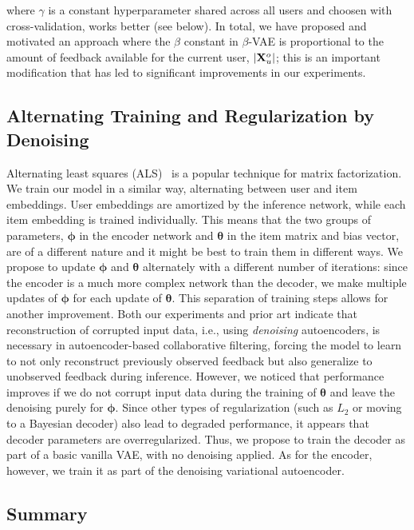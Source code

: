 \documentclass[sigconf,authorversion]{acmart}
\def\XX{{\bf X}}
\def\btheta{{\boldsymbol{\theta}}}
\def\bphi{{\boldsymbol{\phi}}}
\begin{document}
\noindent
where $\gamma$ is a constant hyperparameter shared across all users and choosen with cross-validation, works better (see below). 
In total, we have proposed and motivated an approach where the $\beta$ constant in $\beta$-VAE is proportional to the amount of feedback available for the current user, $|\XX_u^o|$; this is an important modification that has led to significant improvements in our experiments.

\subsection{Alternating Training and Regularization by Denoising}\label{sec:als}

Alternating least squares (ALS)~\cite{bell2007scalable} is a popular technique for matrix factorization. We train our model in a similar way, alternating between user and item embeddings. User embeddings are amortized by the inference network, while each item embedding is trained individually. This means that the two groups of parameters, $\bphi$ in the encoder network and $\btheta$ in the item matrix and bias vector, are of a different nature and it might be best to train them in different ways. We propose to update $\bphi$ and $\btheta$ alternately with a different number of iterations: since the encoder is a much more complex network than the decoder, we make multiple updates of $\bphi$ for each update of $\btheta$.
This separation of training steps allows for another improvement. Both our experiments and prior art indicate that reconstruction of corrupted input data, i.e., using \emph{denoising} autoencoders, is necessary in autoencoder-based collaborative filtering, forcing the model to learn to not only reconstruct previously observed feedback but also generalize to unobserved feedback during inference. However, we noticed that performance improves if we do not corrupt input data during the training of $\btheta$ and leave the denoising purely for $\bphi$.
Since other types of regularization (such as $L_2$ or moving to a Bayesian decoder) also lead to degraded performance, it appears that decoder parameters are overregularized. Thus, we propose to train the decoder as part of a basic vanilla VAE, with no denoising applied. As for the encoder, however, we train it as part of the denoising variational autoencoder.

\subsection{Summary}
\end{document}
